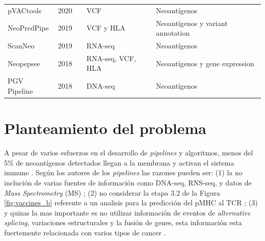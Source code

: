\documentclass[a4paper]{article}
\begin{document}
\begin{table}[h]
{\begin{tabular}{lp{0.6cm}p{3cm}p{4.5cm}p{2.7cm}}
	pVACtools       & 2020 &\cite{hundal2020pvactools}        & VCF                                         & Neoantígenos                                       \\
	
	NeoPredPipe     & 2019 &\cite{schenck2019neopredpipe}     & VCF y HLA                            & Neoantígenos y variant annotation              \\
	
	ScanNeo         & 2019 &\cite{wang2019scanneo}            & RNA-seq                                                  & Neoantígenos                                       \\
	
		
	Neopepsee       & 2018 &\cite{kim2018neopepsee}           & RNA-seq, VCF, HLA  & Neoantígenos y gene expression    \\ 
	
	PGV Pipeline    & 2018 &\cite{rubinsteyn2018computational}& DNA-seq                                                  & Neoantígenos                                       \\
	
	
	
	
	
\end{tabular}
	
	}
\end{table}




\section{Planteamiento del problema}

A pesar de varios esfuerzos en el desarrollo de \textit{pipelines} y algoritmos, menos del 5\% de neoantígenos detectados llegan a la membrana y activan el sistema immune \citep{de2020neoantigen, mill2022neoms, bulik2019deep, bassani2015mass, yadav2014predicting}. Según los autores de los \textit{pipelines} las razones pueden ser: (1) la no inclución de varias fuentes de información como DNA-seq, RNS-seq, y datos de \textit{Mass Spectrometry} (MS)  \citep{kim2018neopepsee}; (2) no considerar la etapa 3.2 de la Figura \ref{fig:vaccines_b} referente a un analisis para la predicción del pMHC al TCR \citep{rubinsteyn2018computational}; (3) y quizas la mas importante es no utilizar información de eventos de \textit{alternative splicing}, variaciones estructurales y la fusión de genes, esta información esta fuertemente relacionada con varios tipos de cancer \citep{wood2020neoepiscope}.
\end{document}
